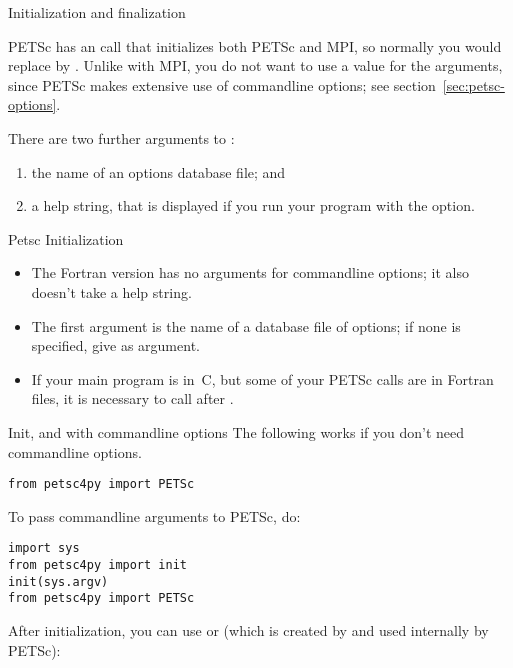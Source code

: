  {Initialization and finalization}
\label{sec:petscinit}

PETSc has an call that initializes both PETSc and MPI, so normally you
would replace  by
.
Unlike with MPI, you do not want to
use a  value for the  arguments, since PETSc
makes extensive use of commandline options; see
section~\ref{sec:petsc-options}.


There are two further arguments to :
\begin{enumerate}
\item the name of an options database file; and
\item a help string, that is displayed if you run your program with the  option.
\end{enumerate}

\begin{fortrannote}{Petsc Initialization}
  \begin{itemize}
  \item
    The Fortran version has no arguments for commandline options;
    it also doesn't take a help string.
  \item The first argument is the name of a database file of options;
    if none is specified, give  as argument.
  \item If your main program is in~C, but some of your PETSc calls are
    in Fortran files, it is necessary to call
     after
    .
  \end{itemize}
\end{fortrannote}

\begin{pythonnote}{Init, and with commandline options}
  The following works if you don't need commandline options.
\begin{verbatim}
from petsc4py import PETSc
\end{verbatim}
To pass commandline arguments to PETSc, do:
\begin{verbatim}
import sys
from petsc4py import init
init(sys.argv)
from petsc4py import PETSc
\end{verbatim}
\end{pythonnote}

After initialization, you can use  or
(which is created by  and used internally by PETSc):

